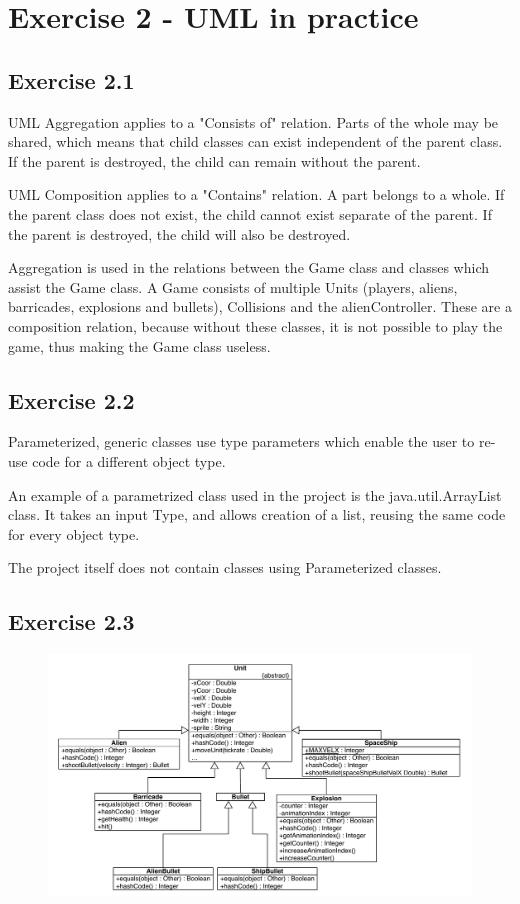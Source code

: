 \documentclass[10pt]{article}
\begin{document}
\section{Exercise 2 - UML in practice}
\subsection{Exercise 2.1}
UML Aggregation applies to a "Consists of" relation.
Parts of the whole may be shared, which means that child classes can exist independent of the parent class.
If the parent is destroyed, the child can remain without the parent.

UML Composition applies to a "Contains" relation.
A part belongs to a whole. If the parent class does not exist, the child cannot exist separate of the parent. 
If the parent is destroyed, the child will also be destroyed.

Aggregation is used in the relations between the Game class and classes which assist the Game class.
A Game consists of multiple Units (players, aliens, barricades, explosions and bullets), Collisions and the alienController. These are a composition relation, because without these classes, it is not possible to play the game, thus making the Game class useless.

\subsection{Exercise  2.2}
Parameterized, generic classes use type parameters which enable the user to re-use code for a different object type. 

An example of a parametrized class used in the project is the java.util.ArrayList class.
It takes an input Type, and allows creation of a list, reusing the same code for every object type.

The project itself does not contain classes using Parameterized classes.

\subsection{Exercise  2.3}
\begin{figure}[ht!]
\includegraphics[width=1.1\textwidth]{SI-UMLhierarchies.pdf}
\end{figure}
\end{document}
